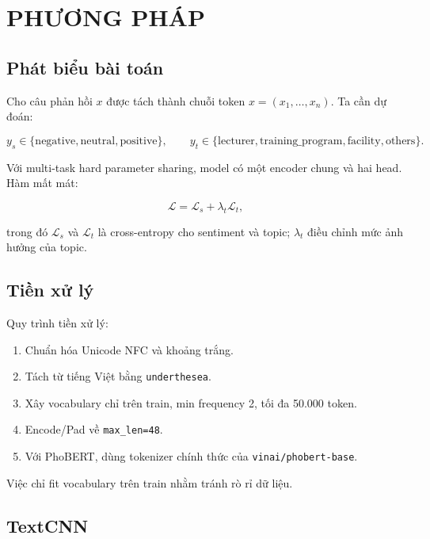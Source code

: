 \documentclass[12pt,a4paper]{report}
\begin{document}
\chapter{PHƯƠNG PHÁP}

\section{Phát biểu bài toán}

Cho câu phản hồi \(x\) được tách thành chuỗi token \(x = (x_1, \ldots, x_n)\). Ta cần dự đoán:

\[
y_s \in \{\text{negative}, \text{neutral}, \text{positive}\}, \qquad
y_t \in \{\text{lecturer}, \text{training\_program}, \text{facility}, \text{others}\}.
\]

Với multi-task hard parameter sharing, model có một encoder chung và hai head. Hàm mất mát:

\begin{equation}
\mathcal{L} = \mathcal{L}_s + \lambda_t \mathcal{L}_t,
\end{equation}

trong đó \(\mathcal{L}_s\) và \(\mathcal{L}_t\) là cross-entropy cho sentiment và topic; \(\lambda_t\) điều chỉnh mức ảnh hưởng của topic.

\section{Tiền xử lý}

Quy trình tiền xử lý:

\begin{enumerate}[leftmargin=1.2cm]
  \item Chuẩn hóa Unicode NFC và khoảng trắng.
  \item Tách từ tiếng Việt bằng \texttt{underthesea}.
  \item Xây vocabulary chỉ trên train, min frequency 2, tối đa 50.000 token.
  \item Encode/Pad về \texttt{max\_len=48}.
  \item Với PhoBERT, dùng tokenizer chính thức của \texttt{vinai/phobert-base}.
\end{enumerate}

Việc chỉ fit vocabulary trên train nhằm tránh rò rỉ dữ liệu.

\section{TextCNN}
\end{document}
